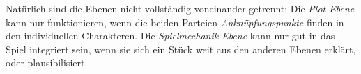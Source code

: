 Natürlich sind die Ebenen nicht vollständig voneinander getrennt: Die
\emph{Plot-Ebene} kann nur funktionieren, wenn die beiden Parteien
\emph{Anknüpfungspunkte} finden in den individuellen Charakteren. Die
\emph{Spielmechanik-Ebene} kann nur gut in das Spiel integriert sein, wenn sie
sich ein Stück weit aus den anderen Ebenen erklärt, oder plausibilisiert.


